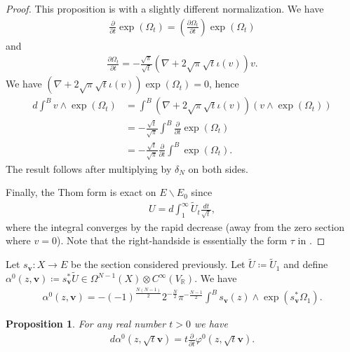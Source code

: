 \documentclass[a4paper,11pt]{amsart} %
\newcommand{\8}{\infty}
\newcommand{\vbf}{\mathbf{v}}
\newcommand{\Util}{\widetilde{U}}
\newcommand{\R}{\mathbb{R}}
\theoremstyle{mytheoremstyle}
\newtheorem{prop}[thm]{Proposition}
\theoremstyle{remark}
\numberwithin{equation}{section}
\begin{document}
\begin{proof} This proposition is \cite[Proposition.~1.53]{berline} with a slightly different normalization. We have
\begin{align}
\frac{\partial}{\partial t}\exp(\Omega_t)=\left (\frac{\partial \Omega_t}{\partial t} \right )\exp(\Omega_t)
\end{align}
and
\begin{align}
\frac{\partial \Omega_t}{\partial t}= -\frac{\sqrt{\pi}}{\sqrt{t}} \left ( \nabla+2\sqrt{\pi}\sqrt{t}\iota(v) \right ) v.
\end{align}
We have $\left ( \nabla+2\sqrt{\pi}\sqrt{t}\iota(v) \right )\exp(\Omega_t)=0$, hence
\begin{align}
d\int^B v \wedge  \exp(\Omega_t)& = \int^B \left ( \nabla+2\sqrt{\pi}\sqrt{t}\iota(v) \right ) \left ( v \wedge \exp(\Omega_t)\right ) \nonumber \\
& = -\frac{\sqrt{t}}{\sqrt{\pi}}\int^B \frac{\partial}{\partial t}\exp(\Omega_t) \nonumber \\
& = -\frac{\sqrt{t}}{\sqrt{\pi}}\frac{\partial}{\partial t} \int^B\exp(\Omega_t).
\end{align}
The result follows after multiplying by $\delta_N$ on both sides. 

Finally, the Thom form is exact on $E \smallsetminus E_0$ since
\begin{align}
U= d \int_1^\8 \Util_t \frac{dt}{\sqrt{t}},
\end{align}
where the integral converges by the rapid decrease (away from the zero section where $v=0$). Note that the right-handside is essentially the form $\tau$ in \cite[p.~106]{mq}. 
\end{proof}
Let $s_\vbf \colon X \longrightarrow E$ be the section considered previously. Let $\Util \coloneqq \Util_1$ and define $\alpha^0(z,\vbf) \coloneqq s_\vbf^\ast \Util \in \Omega^{N-1}(X) \otimes C^\8(V_\R)$. We have
\begin{align}
\alpha^0(z,\vbf) = -(-1)^{\frac{N(N-1)}{2}}2^{-\frac{N}{2}}\pi^{-\frac{N-1}{2}} \int^B s_\vbf(z) \wedge \exp(s_\vbf^\ast \Omega_1).
\end{align}
\begin{prop} For any real number $t>0$ we have
    \begin{align} \label{alphatilprop}
        d\alpha^0(z,\sqrt{t}\vbf)= t\frac{\partial}{\partial t}\varphi^0(z,\sqrt{t}\vbf).
    \end{align}
\end{prop}
\end{document}
